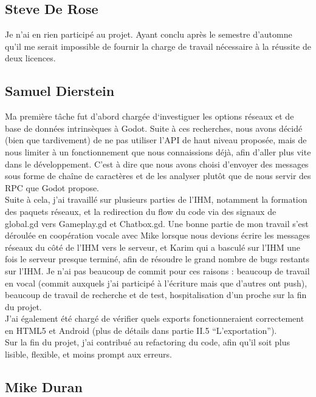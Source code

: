 \documentclass[a4paper,11pt]{article}
\begin{document}
\subsection{Steve De Rose}

Je n’ai en rien participé au projet. Ayant conclu après le semestre d’automne qu’il me serait impossible de fournir la charge de travail nécessaire à la réussite de deux licences. \\

\subsection{Samuel Dierstein}

Ma première tâche fut d’abord chargée d‘investiguer les options réseaux et de base de données  intrinsèques à Godot. Suite à ces recherches, nous avons décidé (bien que tardivement) de ne pas utiliser l’API de haut niveau proposée, mais de nous limiter à un fonctionnement que nous connaissions déjà, afin d’aller plus vite dans le développement. C’est à dire que nous avons choisi d’envoyer des messages sous forme de chaîne de caractères et de les analyser plutôt que de nous servir des RPC que Godot propose.  \\

Suite à cela, j’ai travaillé sur plusieurs parties de l’IHM, notamment la formation des paquets réseaux, et la redirection du flow du code via des signaux de global.gd vers Gameplay.gd et Chatbox.gd. Une bonne partie de mon travail s’est déroulée en coopération vocale avec Mike lorsque nous devions écrire les messages réseaux du côté de l’IHM vers le serveur, et Karim qui a basculé sur l’IHM une fois le serveur presque terminé, afin de résoudre le grand nombre de bugs restants sur l’IHM. Je n’ai pas beaucoup de commit pour ces raisons : beaucoup de travail en vocal (commit auxquels j’ai participé à l’écriture mais que d’autres ont push), beaucoup de travail de recherche et de test, hospitalisation d’un proche sur la fin du projet. \\

J’ai également été chargé de vérifier quels exports fonctionneraient  correctement en HTML5 et Android (plus de détails dans partie II.5 “L'exportation”). \\

Sur la fin du projet, j’ai contribué au refactoring du code, afin qu’il soit plus lisible, flexible, et moins prompt aux erreurs. 

\subsection{Mike Duran}
\end{document}
